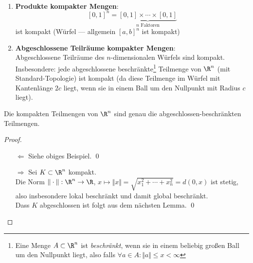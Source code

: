 \begin{example}
  \
  \begin{enumerate}
    \item \textbf{Produkte kompakter Mengen}:
      \begin{equation*}
        {[0,1]}^n = \underbrace{[0,1] \times \cdots \times [0,1]}_{n \text{ Faktoren}}
      \end{equation*}
      ist kompakt (Würfel --- allgemein \( {[a,b]}^n \) ist kompakt) 
    \item \textbf{Abgeschlossene Teilräume kompakter Mengen}\label{bsp:abgeschlosseneTRkompakterMengen}: \\
      Abgeschlossene Teilräume des \( n \)-dimensionalen Würfels sind kompakt. Insbesondere: jede abgeschlossene beschränkte\footnote{Eine Menge \( A \subset \R^n \) ist \emph{beschränkt}, wenn sie in einem beliebig großen Ball um den Nullpunkt liegt, also falls \( \forall a \in A : \Vert a \Vert \leq x < \infty \)} Teilmenge von \( \R^n \) (mit Standard-Topologie) ist kompakt (da diese Teilmenge im Würfel mit Kantenlänge \( 2c \) liegt, wenn sie in einem Ball um den Nullpunkt mit Radius \( c \) liegt).
  \end{enumerate}
\end{example}

\begin{theorem}
  Die kompakten Teilmengen von \( \R^n \) sind genau die abgeschlossen-beschränkten Teilmengen.
  \begin{proof}
    \
    \begin{itemize}
      \item[\( \Leftarrow \)] Siehe obiges Beispiel. \qed{}
      \item[\( \Rightarrow \)] Sei \( K \subset \R^n \) kompakt. \\
        Die Norm \( \Vert \cdot \Vert : \R^n \to \R \), \( x \mapsto \Vert x \Vert = \sqrt{x_1^2 + \cdots + x_n^2} = d(0,x) \) ist stetig, also insbesondere lokal beschränkt und damit global beschränkt. \\
        Dass \( K \) abgeschlossen ist folgt aus dem nächsten Lemma. \qed{}
    \end{itemize}
  \end{proof}
\end{theorem}

